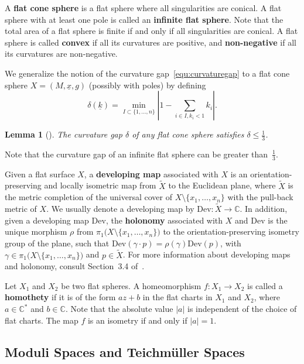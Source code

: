 \documentclass{compositio}
\numberwithin{equation}{section}
\numberwithin{figure}{section}
\theoremstyle{definition}
\theoremstyle{plain}
\newtheorem{lemma}[definition]{Lemma}
\begin{document}
{A \textbf{flat cone sphere} is a flat sphere where all singularities are conical. A flat sphere with at least one pole is called an \textbf{infinite flat sphere}. Note that the total area of a flat sphere is finite if and only if all singularities are conical. A flat sphere is called \textbf{convex} if all its curvatures are positive, and \textbf{non-negative} if all its curvatures are non-negative.

We generalize the notion of the curvature gap~\eqref{equ:curvaturegap} to a flat cone sphere $X = (M, \underline{x}, g)$ (possibly with poles) by defining
$$
    \delta(\underline{k}) = \min_{I \subset \{1, \ldots, n\}} \left| 1 - \sum_{i \in I, k_i < 1} k_i \right|.
$$

\begin{lemma}[{\cite[Lemma~2.2]{fu2023boundssaddleconnectionsflat}}]\label{lem:upperboundcurvaturegap}
    The curvature gap $\delta$ of any flat cone sphere satisfies $\delta \leq \frac{1}{3}$.
\end{lemma}

Note that the curvature gap of an infinite flat sphere can be greater than~$\frac{1}{3}$.

Given a flat surface $X$, a \textbf{developing map} associated with $X$ is an orientation-preserving and locally isometric map from $\widetilde{X}$ to the Euclidean plane, where $\widetilde{X}$ is the metric completion of the universal cover of $X \setminus \{x_1, \ldots, x_n\}$ with the pull-back metric of $X$. We usually denote a developing map by $\mathrm{Dev}: \widetilde{X} \to \mathbb{C}$. In addition, given a developing map $\mathrm{Dev}$, the \textbf{holonomy} associated with $X$ and $\mathrm{Dev}$ is the unique morphism $\rho$ from $\pi_1\big(X \setminus \{x_1, \ldots, x_n\}\big)$ to the orientation-preserving isometry group of the plane, such that $\mathrm{Dev}(\gamma \cdot p) = \rho(\gamma) \mathrm{Dev}(p)$, with $\gamma\in \pi_1\big(X \setminus \{x_1, \ldots, x_n\}\big)$ and $p\in \widetilde{X}$. For more information about developing maps and holonomy, consult Section~3.4 of~\cite{Thurston1997}.

Let $X_1$ and $X_2$ be two flat spheres. A homeomorphism $f: X_1 \to X_2$ is called a \textbf{homothety} if it is of the form $az + b$ in the flat charts in $X_1$ and $X_2$, where $a \in \mathbb{C}^*$ and $b \in \mathbb{C}$. Note that the absolute value $|a|$ is independent of the choice of flat charts. The map $f$ is an isometry if and only if $|a| = 1$.

\subsection{Moduli Spaces and Teichm\"uller Spaces}\label{sec:basicdef}

}
\end{document}
